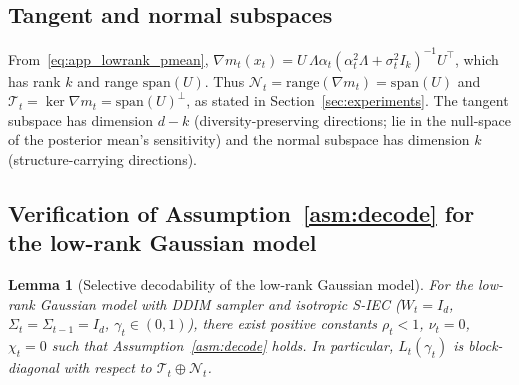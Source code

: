 \documentclass{article}
\theoremstyle{plain}
\newtheorem{lemma}[theorem]{Lemma}
\theoremstyle{definition}
\theoremstyle{remark}
\newcommand{\SIEC}{\texorpdfstring{S\mbox{-}IEC\xspace}{S-IEC }}
\begin{document}
\subsection{Tangent and normal subspaces}
From~\eqref{eq:app_lowrank_pmean}, \(\nabla m_t(x_t) = U\,\Lambda\alpha_t
(\alpha_t^2\Lambda + \sigma_t^2 I_k)^{-1}U^\top\), which has rank \(k\) and
range \(\mathrm{span}(U)\). Thus
\(\mathcal{N}_t = \mathrm{range}(\nabla m_t) = \mathrm{span}(U)\) and
\(\mathcal{T}_t = \ker \nabla m_t = \mathrm{span}(U)^\perp\), as stated in
Section~\ref{sec:experiments}. The tangent subspace has dimension \(d-k\)
(diversity-preserving directions; lie in the null-space of the posterior
mean's sensitivity) and the normal subspace has dimension \(k\)
(structure-carrying directions).

\subsection{Verification of Assumption~\ref{asm:decode} for the
            low-rank Gaussian model}

\begin{lemma}[Selective decodability of the low-rank Gaussian model]
\label{lem:decode_verify}
For the low-rank Gaussian model with DDIM sampler and isotropic \SIEC
(\(W_t=I_d\), \(\Sigma_t=\Sigma_{t-1}=I_d\), \(\gamma_t\in(0,1)\)), there
exist positive constants \(\rho_t<1\), \(\nu_t=0\), \(\chi_t=0\) such that
Assumption~\ref{asm:decode} holds. In particular, \(L_t(\gamma_t)\) is
block-diagonal with respect to \(\mathcal{T}_t\oplus\mathcal{N}_t\).
\end{lemma}
\end{document}
